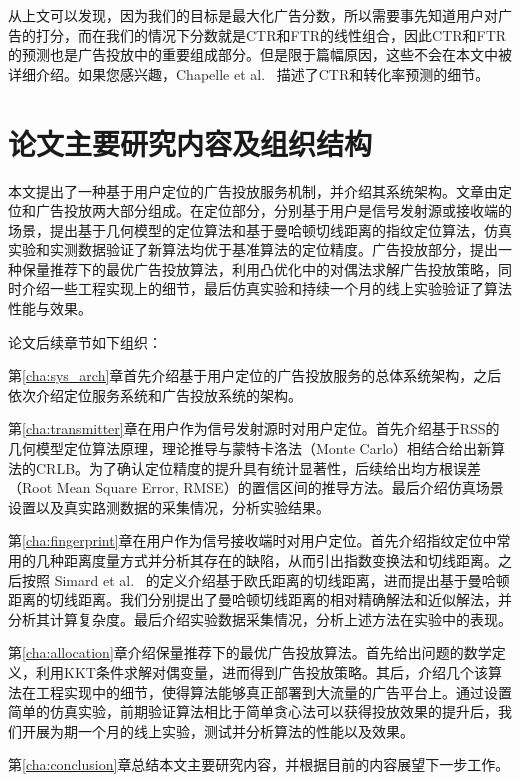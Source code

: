 从上文可以发现，因为我们的目标是最大化广告分数，所以需要事先知道用户对广告的打分，而在我们的情况下分数就是CTR和FTR的线性组合，因此CTR和FTR的预测也是广告投放中的重要组成部分。但是限于篇幅原因，这些不会在本文中被详细介绍。如果您感兴趣，Chapelle et al.~\cite{chapelle2015simple} 描述了CTR和转化率预测的细节。

\section{论文主要研究内容及组织结构}

本文提出了一种基于用户定位的广告投放服务机制，并介绍其系统架构。文章由定位和广告投放两大部分组成。在定位部分，分别基于用户是信号发射源或接收端的场景，提出基于几何模型的定位算法和基于曼哈顿切线距离的指纹定位算法，仿真实验和实测数据验证了新算法均优于基准算法的定位精度。广告投放部分，提出一种保量推荐下的最优广告投放算法，利用凸优化中的对偶法求解广告投放策略，同时介绍一些工程实现上的细节，最后仿真实验和持续一个月的线上实验验证了算法性能与效果。

论文后续章节如下组织：

第\ref{cha:sys_arch}章首先介绍基于用户定位的广告投放服务的总体系统架构，之后依次介绍定位服务系统和广告投放系统的架构。

第\ref{cha:transmitter}章在用户作为信号发射源时对用户定位。首先介绍基于RSS的几何模型定位算法原理，理论推导与蒙特卡洛法（Monte Carlo）相结合给出新算法的CRLB。为了确认定位精度的提升具有统计显著性，后续给出均方根误差（Root Mean Square Error, RMSE）的置信区间的推导方法。最后介绍仿真场景设置以及真实路测数据的采集情况，分析实验结果。

第\ref{cha:fingerprint}章在用户作为信号接收端时对用户定位。首先介绍指纹定位中常用的几种距离度量方式并分析其存在的缺陷，从而引出指数变换法和切线距离。之后按照 Simard et al.~\cite{simard1998transformation} 的定义介绍基于欧氏距离的切线距离，进而提出基于曼哈顿距离的切线距离。我们分别提出了曼哈顿切线距离的相对精确解法和近似解法，并分析其计算复杂度。最后介绍实验数据采集情况，分析上述方法在实验中的表现。

第\ref{cha:allocation}章介绍保量推荐下的最优广告投放算法。首先给出问题的数学定义，利用KKT条件求解对偶变量，进而得到广告投放策略。其后，介绍几个该算法在工程实现中的细节，使得算法能够真正部署到大流量的广告平台上。通过设置简单的仿真实验，前期验证算法相比于简单贪心法可以获得投放效果的提升后，我们开展为期一个月的线上实验，测试并分析算法的性能以及效果。

第\ref{cha:conclusion}章总结本文主要研究内容，并根据目前的内容展望下一步工作。


